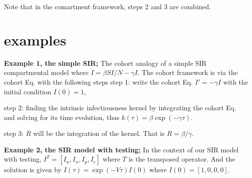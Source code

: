 \documentclass[12pt]{article}
\theoremstyle{definition} %
\begin{document}
Note that in the comartment framework, steps 2 and 3 are combined.
\section{examples}

{\bf Example 1, the simple SIR;}
The cohort analogy of a simple SIR compartmental model where $\dot I=\beta S I/N-\gamma I$. The cohort framework is via the cohort Eq. with the following steps
step 1: write the cohort Eq. $I'=-\gamma I$ with the initial condition $I(0)=1$, 

step 2: finding the intrinsic infectiousness kernel by integrating the cohort Eq. and solving for its time evolution, thus
$k(\tau)=\beta \exp(-\gamma \tau)$.

step 3: $R$ will be the integration of the kernel. That is $R=\beta/\gamma$. 

{\bf Example 2, the SIR model with testing;}
In the context of our SIR model with testing, $I^T=[I_u,I_n,I_p,I_c]$ where $T$ is the transposed operator.
And the solution is given by $I(\tau) = \exp(-V\tau) I(0)$ where $I(0)=[1,0,0,0]$.




\end{document}
